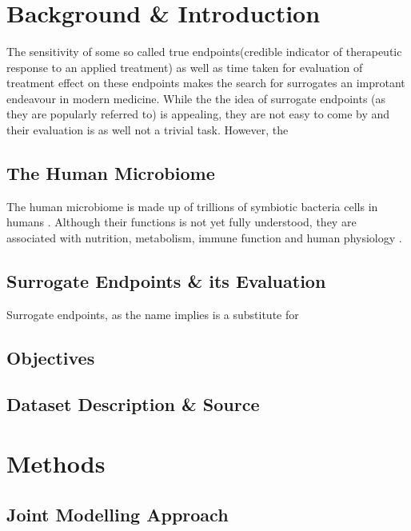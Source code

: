 \documentclass[a4paper]{article}\usepackage[]{graphicx}\usepackage[]{color}
\title{
\begin{flushleft} 
\Huge {\color{black!90}{\fontfamily{phv}\selectfont 2016\textbullet2017 \\   Faculty of Sciences \\ \large\textit{Master of Statistics} \\ \vspace{1.0in} Master's Thesis \\ Evaluation of Surrogate Endpoints in Human Microbiome \\ \vspace{1.0in} \large Supervisor:\\Prof. dr. Shekdy Ziv \\ \vspace{0.5in} Supervisor:\\ Dr. Van Der Elst, Wim \\ \vspace{1.0in}\Large Olusoji Oluwafemi Daniel\\ \large\textit{Thesis presented in fulfillment of the requirements for the degree of Master of
Statistics}}}
\end{flushleft}
}
\date{}
\begin{document}
\maketitle
\newpage

\tableofcontents

\section{Background \& Introduction}
The sensitivity of some so called true endpoints(credible indicator of therapeutic response to an applied treatment) as well as time taken for evaluation of treatment effect on these endpoints makes the search for surrogates an improtant endeavour in modern medicine\supercite{Burzykowski2005}. While the the idea of surrogate endpoints (as they are popularly referred to) is appealing, they are not easy to come by and their evaluation is as well not a trivial task. However, the  

\subsection{The Human Microbiome}
The human microbiome is made up of trillions of symbiotic bacteria cells in humans \supercite{ursell}. Although their functions is not yet fully understood, they are associated with nutrition, metabolism, immune function and human physiology \supercite{bull}.

\subsection{Surrogate Endpoints \& its Evaluation}
Surrogate endpoints, as the name implies is a substitute for 
\subsection{Objectives}

\subsection{Dataset Description \& Source}

\section{Methods}

\subsection{Joint Modelling Approach}
\end{document}
